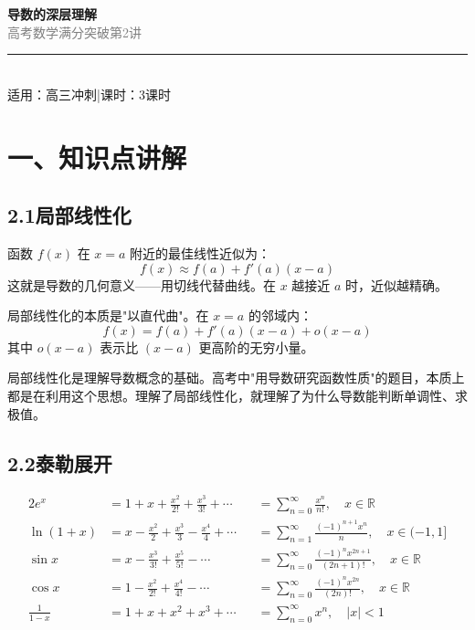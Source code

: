 \documentclass[12pt, a4paper]{ctexart}
\begin{document}
\begin{center}
{\Huge\bfseries\textcolor{mainblue}{导数的深层理解}}\\[12pt]
{\Large\textcolor{gray}{高考数学满分突破\quad 第2讲}}\\[8pt]
\rule{0.6\textwidth}{1pt}\\[8pt]
{\normalsize 适用：高三冲刺\quad |\quad 课时：3课时}
\end{center}
\vspace{10pt}

\section*{\textcolor{mainblue}{一、知识点讲解}}

\subsection*{2.1\quad 局部线性化}

\begin{knowledgebox}[核心思想]
函数 $f(x)$ 在 $x = a$ 附近的最佳线性近似为：
\[
f(x) \approx f(a) + f'(a)(x - a)
\]
这就是导数的几何意义——用切线代替曲线。在 $x$ 越接近 $a$ 时，近似越精确。
\end{knowledgebox}

局部线性化的本质是"以直代曲"。在 $x = a$ 的邻域内：
\[
f(x) = f(a) + f'(a)(x-a) + o(x-a)
\]
其中 $o(x-a)$ 表示比 $(x-a)$ 更高阶的无穷小量。

\begin{tipbox}[高考应用]
局部线性化是理解导数概念的基础。高考中"用导数研究函数性质"的题目，本质上都是在利用这个思想。理解了局部线性化，就理解了为什么导数能判断单调性、求极值。
\end{tipbox}

\subsection*{2.2\quad 泰勒展开}

\begin{knowledgebox}[常用函数的泰勒展开（麦克劳林级数，即 $x_0 = 0$ 处展开）]
\begin{alignat*}{2}
e^x &= 1 + x + \frac{x^2}{2!} + \frac{x^3}{3!} + \cdots &&= \sum_{n=0}^{\infty} \frac{x^n}{n!}, \quad x \in \mathbb{R} \\[6pt]
\ln(1+x) &= x - \frac{x^2}{2} + \frac{x^3}{3} - \frac{x^4}{4} + \cdots &&= \sum_{n=1}^{\infty} \frac{(-1)^{n+1} x^n}{n}, \quad x \in (-1, 1] \\[6pt]
\sin x &= x - \frac{x^3}{3!} + \frac{x^5}{5!} - \cdots &&= \sum_{n=0}^{\infty} \frac{(-1)^n x^{2n+1}}{(2n+1)!}, \quad x \in \mathbb{R} \\[6pt]
\cos x &= 1 - \frac{x^2}{2!} + \frac{x^4}{4!} - \cdots &&= \sum_{n=0}^{\infty} \frac{(-1)^n x^{2n}}{(2n)!}, \quad x \in \mathbb{R} \\[6pt]
\frac{1}{1-x} &= 1 + x + x^2 + x^3 + \cdots &&= \sum_{n=0}^{\infty} x^n, \quad |x| < 1
\end{alignat*}
\end{knowledgebox}
\end{document}

